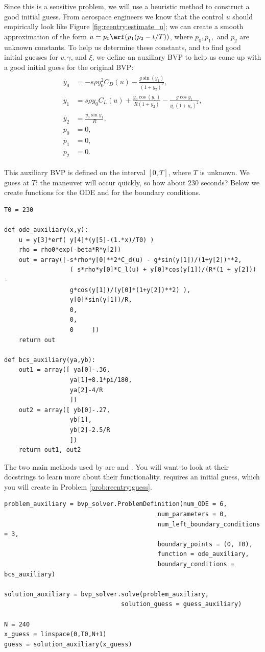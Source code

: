 Since this is a sensitive problem, we will use a heuristic method to  construct a good initial guess.
From aerospace engineers we know that the control $u$ should empirically look like Figure \ref{fig:reentry:estimate_u}; 
we can create a smooth approximation of the form $u = p_0\erf(p_1(p_2-t/T))$, where $p_0, p_1,$ and $p_2$ are unknown constants. 
To help us determine these constants, and to find good initial guesses for $v, \gamma$, and $\xi$, we define an auxiliary BVP to help us come up with a good initial guess for the original BVP:
\begin{align}
\begin{split}
\dot{y_0} &= -s\rho y_0^2C_D(u) - \frac{g\sin(y_1)}{(1+y_2)^2},\\
\dot{y_1} &= s \rho y_0 C_L(u) + \frac{y_0 \cos(y_1)}{R(1+y_2)} - \frac{g \cos y_1}{y_0(1+y_2)^2},\\
\dot{y_2} &= \frac{y_0 \sin y_1}{R} ,\\
\dot{p_0} &= 0, \\
\dot{p_1} &= 0, \\
\dot{p_2} &= 0.
\end{split} \label{eqn:reentry:control_system_auxiliary}
\end{align}

This auxiliary BVP is defined on the interval $[0,T]$, where $T$ is unknown. 
We guess at $T$: the maneuver will occur quickly, so how about 230 seconds?
Below we create functions for the ODE and for the boundary conditions. 
\begin{lstlisting}
T0 = 230	
	
def ode_auxiliary(x,y):
	u = y[3]*erf( y[4]*(y[5]-(1.*x)/T0) )
	rho = rho0*exp(-beta*R*y[2])
	out = array([-s*rho*y[0]**2*C_d(u) - g*sin(y[1])/(1+y[2])**2,
				  ( s*rho*y[0]*C_l(u) + y[0]*cos(y[1])/(R*(1 + y[2])) -
				  g*cos(y[1])/(y[0]*(1+y[2])**2) ),
				  y[0]*sin(y[1])/R,
				  0,
				  0,
				  0		])
	return out

def bcs_auxiliary(ya,yb):
	out1 = array([ ya[0]-.36,
				  ya[1]+8.1*pi/180,
				  ya[2]-4/R
				  ])
	out2 = array([ yb[0]-.27,
				  yb[1],
				  yb[2]-2.5/R
				  ])
	return out1, out2
\end{lstlisting}

The two main methods used by  are  and . 
You will want to look at their docstrings to learn more about their functionality. 
 requires an initial guess, which you will create in Problem \ref{prob:reentry:guess}.
\begin{lstlisting}
problem_auxiliary = bvp_solver.ProblemDefinition(num_ODE = 6,
										  num_parameters = 0,
										  num_left_boundary_conditions = 3,
										  boundary_points = (0, T0),
										  function = ode_auxiliary,
										  boundary_conditions = bcs_auxiliary)

solution_auxiliary = bvp_solver.solve(problem_auxiliary,
								solution_guess = guess_auxiliary)

N = 240 
x_guess = linspace(0,T0,N+1)
guess = solution_auxiliary(x_guess)
\end{lstlisting}

